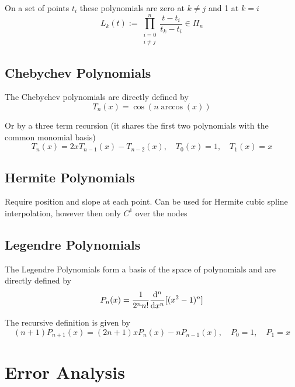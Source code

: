 \documentclass[
    a4paper,
    11pt
]{article}
\begin{document}
On a set of points $t_i$ these polynomials are zero at $k \neq j$ and 1 at $k =
i$
\begin{equation}
    L_k(t) := \prod_{\substack{i=0 \\ i\neq j}}^{n} \frac{t - t_i}{t_k - t_i}
    \in \Pi_n
\end{equation}

\subsection{Chebychev Polynomials}

The Chebychev polynomials are directly defined by
\begin{equation}
    T_n(x) = \cos(n\arccos(x))
\end{equation}

Or by a three term recursion (it shares the first two polynomials with the
common monomial basis)
\begin{equation}
    T_n(x) = 2xT_{n-1}(x) - T_{n-2}(x), \quad T_0(x) = 1, \quad T_1(x) = x
\end{equation}

\subsection{Hermite Polynomials}

Require position and slope at each point. Can be used for Hermite cubic spline
interpolation, however then only $C^1$ over the nodes

\subsection{Legendre Polynomials}

The Legendre Polynomials form a basis of the space of polynomials and are
directly defined by
\begin{equation}
    P_n(x) = \frac{1}{2^n n!} \dv[n]{}{x}[(x^2 - 1)^n]
\end{equation}

The recursive definition is given by
\begin{equation}
    (n+1)P_{n+1}(x) = (2n+1)xP_n(x) - n P_{n-1}(x), \quad P_0 = 1, \quad P_1=x
\end{equation}



\section{Error Analysis}
\end{document}
